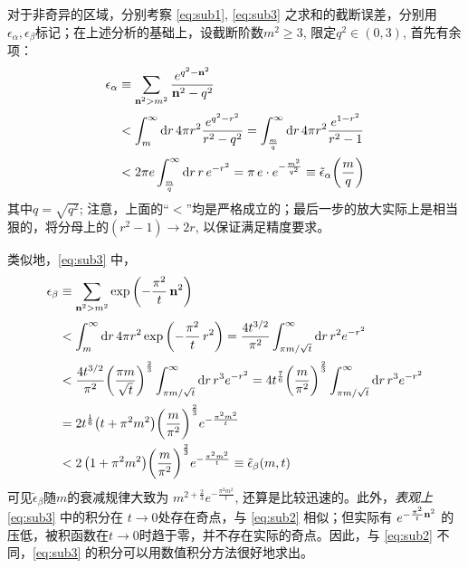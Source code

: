 \documentclass[preview,10pt,border=8pt]{standalone}
\begin{document}
	对于非奇异的区域，分别考察 \eqref{eq:sub1}, \eqref{eq:sub3} 之求和的截断误差，分别用$\epsilon_\alpha, \epsilon_\beta$标记；在上述分析的基础上，设截断阶数$m^2 \ge 3$, 限定$q^2 \in (0,3)$, 首先有余项：
	\begin{equation}
	\begin{aligned}
		\epsilon_\alpha
		&\equiv \sum_{\vb{n}^2 > m^2}
				\frac{e^{q^2 - \vb{n}^2}}
					{\vb{n}^2 - q^2} \\[.5ex]
		&< \int_{m}^\infty
				\dd{r} 4\pi r^2
				\frac{e^{q^2 - r^2}}{r^2 - q^2}
		= \int_{\frac{m}{q}}^\infty
				\dd{r} 4\pi r^2
				\frac{e^{1 - r^2}}{r^2 - 1} \\[.5ex]
		&< 2\pi e
			\int_{\frac{m}{q}}^\infty
				\dd{r} r\,e^{- r^2}
		= \pi\,e\cdot e^{- \frac{m^2}{q^2}}
		\equiv \tilde{\epsilon}_\alpha
			\pqty{\frac{m}{q}}
	\end{aligned}
	\end{equation}
	其中$q = \sqrt{q^2}$; 注意，上面的“$<$”均是严格成立的；最后一步的放大实际上是相当狠的，将分母上的$(r^2 - 1) \to 2r$, 以保证满足精度要求。
	
	类似地，\eqref{eq:sub3} 中，
	\begin{equation}
	\begin{aligned}
		\epsilon_\beta 
		&\equiv \sum_{\vb{n}^2 > m^2}
			\exp\pqty{
				-\frac{\pi^2}{t}\,\vb{n}^2} \\[.5ex]
		&< \int_{m}^\infty
			\dd{r} 4\pi r^2
			\exp\pqty{-\frac{\pi^2}{t}\,r^2}
		= \frac{4t^{3/2}}{\pi^2}
			\int_{\pi m/\sqrt{t}}^\infty
				\dd{r} r^2 e^{-r^2} \\[.5ex]
		&< \frac{4t^{3/2}}{\pi^2}
		\pqty{\frac{\pi m}{\sqrt{t}}}^{\frac{2}{3}}
			\int_{\pi m/\sqrt{t}}^\infty
				\dd{r} r^3 e^{-r^2}
		= 4t^{\frac{7}{6}}
			\pqty\bigg{\frac{m}{\pi^2}}^{\frac{2}{3}}
			\int_{\pi m/\sqrt{t}}^\infty
				\dd{r} r^3 e^{-r^2} \\[.35ex]
		&= 2t^{\frac{1}{6}}
			\pqty{t + \pi ^2 m^2}
			\pqty\bigg{\frac{m}{\pi^2}}^{\frac{2}{3}}
			e^{-\frac{\pi ^2 m^2}{t}} \\
		&< 2\,\pqty{1 + \pi ^2 m^2}
			\pqty\bigg{\frac{m}{\pi^2}}^{\frac{2}{3}}
			e^{-\frac{\pi ^2 m^2}{t}}
		\equiv \tilde{\epsilon}_\beta
			\pqty{m, t}
	\end{aligned}
	\end{equation}
	可见$\tilde{\epsilon}_\beta$随$m$的衰减规律大致为
		$m^{2 + \frac{2}{3}}
			e^{-\frac{\pi ^2 m^2}{t}}$, 
	还算是比较迅速的。此外，\textit{表观上} \eqref{eq:sub3} 中的积分在 $t\to 0$处存在奇点，与 \eqref{eq:sub2} 相似；但实际有
		$e^{-\frac{\pi ^2}{t}\vb{n}^2}$
	的压低，被积函数在$t\to 0$时趋于零，并不存在实际的奇点。因此，与 \eqref{eq:sub2} 不同，\eqref{eq:sub3} 的积分可以用数值积分方法很好地求出。
	
\end{document}

